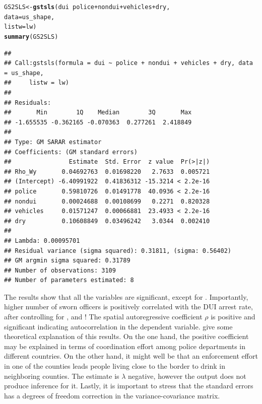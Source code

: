 \documentclass[english,12pt]{book}\usepackage[]{graphicx}\usepackage[]{xcolor}
\makeatletter
\newcommand{\hlopt}[1]{\textcolor[rgb]{0,0,0}{#1}}%
\newcommand{\hlstd}[1]{\textcolor[rgb]{0.345,0.345,0.345}{#1}}%
\newcommand{\hlkwb}[1]{\textcolor[rgb]{0.69,0.353,0.396}{#1}}%
\newcommand{\hlkwc}[1]{\textcolor[rgb]{0.333,0.667,0.333}{#1}}%
\newcommand{\hlkwd}[1]{\textcolor[rgb]{0.737,0.353,0.396}{\textbf{#1}}}%
\newenvironment{kframe}{%
 \def\at@end@of@kframe{}%
 \ifinner\ifhmode%
  \def\at@end@of@kframe{\end{minipage}}%
  \begin{minipage}{\columnwidth}%
 \fi\fi%
 \def\FrameCommand##1{\hskip\@totalleftmargin \hskip-\fboxsep
 \colorbox{shadecolor}{##1}\hskip-\fboxsep
     \hskip-\linewidth \hskip-\@totalleftmargin \hskip\columnwidth}%
 \MakeFramed {\advance\hsize-\width
   \@totalleftmargin\z@ \linewidth\hsize
   \@setminipage}}%
 {\par\unskip\endMakeFramed%
 \at@end@of@kframe}
\newenvironment{knitrout}{}{} %
\makeatother
\begin{document}
\begin{knitrout}
\color{fgcolor}\begin{kframe}
\begin{alltt}
\hlstd{GS2SLS} \hlkwb{<-} \hlkwd{gstsls}\hlstd{(dui} \hlopt{~} \hlstd{police} \hlopt{+} \hlstd{nondui} \hlopt{+} \hlstd{vehicles} \hlopt{+} \hlstd{dry,}
                 \hlkwc{data} \hlstd{= us_shape,}
                 \hlkwc{listw} \hlstd{= lw)}
\hlkwd{summary}\hlstd{(GS2SLS)}
\end{alltt}
\begin{verbatim}
## 
## Call:gstsls(formula = dui ~ police + nondui + vehicles + dry, data = us_shape, 
##     listw = lw)
## 
## Residuals:
##       Min        1Q    Median        3Q       Max 
## -1.655535 -0.362165 -0.070363  0.277261  2.418849 
## 
## Type: GM SARAR estimator
## Coefficients: (GM standard errors) 
##                Estimate  Std. Error  z value  Pr(>|z|)
## Rho_Wy       0.04692763  0.01698220   2.7633  0.005721
## (Intercept) -6.40991922  0.41836312 -15.3214 < 2.2e-16
## police       0.59810726  0.01491778  40.0936 < 2.2e-16
## nondui       0.00024688  0.00108699   0.2271  0.820328
## vehicles     0.01571247  0.00066881  23.4933 < 2.2e-16
## dry          0.10608849  0.03496242   3.0344  0.002410
## 
## Lambda: 0.00095701
## Residual variance (sigma squared): 0.31811, (sigma: 0.56402)
## GM argmin sigma squared: 0.31789
## Number of observations: 3109 
## Number of parameters estimated: 8
\end{verbatim}
\end{kframe}
\end{knitrout}

The results show that all the variables are significant, except for . Importantly, higher number of sworn officers is positively correlated with the DUI arrest rate, after controlling for ,  and ! The spatial autoregressive coefficient $\rho$ is positive and significant indicating autocorrelation in the dependent variable. \cite{drukker2011command} give some theoretical explanation of this results. On the one hand, the positive coefficient may be explained in terms of coordination effort among police departments in different countries. On the other hand, it might well be that an enforcement effort in one of the counties leads people living close to the border to drink in neighboring counties. The estimate is $\lambda$ negative, however the output does not produce inference for it. Lastly, it is important to stress that the standard errors has a degrees of freedom correction in the variance-covariance matrix. 
\end{document}
